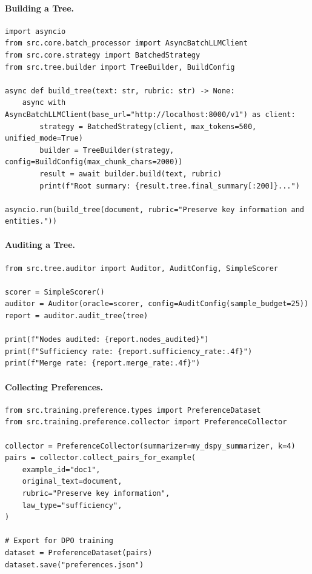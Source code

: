 \paragraph{Building a Tree.}
\begin{lstlisting}
import asyncio
from src.core.batch_processor import AsyncBatchLLMClient
from src.core.strategy import BatchedStrategy
from src.tree.builder import TreeBuilder, BuildConfig

async def build_tree(text: str, rubric: str) -> None:
    async with AsyncBatchLLMClient(base_url="http://localhost:8000/v1") as client:
        strategy = BatchedStrategy(client, max_tokens=500, unified_mode=True)
        builder = TreeBuilder(strategy, config=BuildConfig(max_chunk_chars=2000))
        result = await builder.build(text, rubric)
        print(f"Root summary: {result.tree.final_summary[:200]}...")

asyncio.run(build_tree(document, rubric="Preserve key information and entities."))
\end{lstlisting}

\paragraph{Auditing a Tree.}
\begin{lstlisting}
from src.tree.auditor import Auditor, AuditConfig, SimpleScorer

scorer = SimpleScorer()
auditor = Auditor(oracle=scorer, config=AuditConfig(sample_budget=25))
report = auditor.audit_tree(tree)

print(f"Nodes audited: {report.nodes_audited}")
print(f"Sufficiency rate: {report.sufficiency_rate:.4f}")
print(f"Merge rate: {report.merge_rate:.4f}")
\end{lstlisting}

\paragraph{Collecting Preferences.}
\begin{lstlisting}
from src.training.preference.types import PreferenceDataset
from src.training.preference.collector import PreferenceCollector

collector = PreferenceCollector(summarizer=my_dspy_summarizer, k=4)
pairs = collector.collect_pairs_for_example(
    example_id="doc1",
    original_text=document,
    rubric="Preserve key information",
    law_type="sufficiency",
)

# Export for DPO training
dataset = PreferenceDataset(pairs)
dataset.save("preferences.json")
\end{lstlisting}

